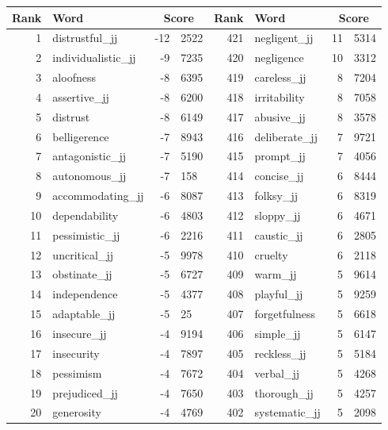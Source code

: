 \begin{table}[tbp]
    \begin{tabular}{| rlr@{.}l | rlr@{.}l |}
    \hline
    \textbf{Rank} & \textbf{Word} & \multicolumn{2}{c|}{\textbf{Score}} & \textbf{Rank} & \textbf{Word} & \multicolumn{2}{c|}{\textbf{Score}} \\
    \hline
    1 & distrustful\_jj & -12 & 2522    &    421 & negligent\_jj & 11 & 5314 \\
    2 & individualistic\_jj & -9 & 7235    &    420 & negligence & 10 & 3312 \\
    3 & aloofness & -8 & 6395    &    419 & careless\_jj & 8 & 7204 \\
    4 & assertive\_jj & -8 & 6200    &    418 & irritability & 8 & 7058 \\
    5 & distrust & -8 & 6149    &    417 & abusive\_jj & 8 & 3578 \\
    6 & belligerence & -7 & 8943    &    416 & deliberate\_jj & 7 & 9721 \\
    7 & antagonistic\_jj & -7 & 5190    &    415 & prompt\_jj & 7 & 4056 \\
    8 & autonomous\_jj & -7 & 158    &    414 & concise\_jj & 6 & 8444 \\
    9 & accommodating\_jj & -6 & 8087    &    413 & folksy\_jj & 6 & 8319 \\
    10 & dependability & -6 & 4803    &    412 & sloppy\_jj & 6 & 4671 \\
    11 & pessimistic\_jj & -6 & 2216    &    411 & caustic\_jj & 6 & 2805 \\
    12 & uncritical\_jj & -5 & 9978    &    410 & cruelty & 6 & 2118 \\
    13 & obstinate\_jj & -5 & 6727    &    409 & warm\_jj & 5 & 9614 \\
    14 & independence & -5 & 4377    &    408 & playful\_jj & 5 & 9259 \\
    15 & adaptable\_jj & -5 & 25    &    407 & forgetfulness & 5 & 6618 \\
    16 & insecure\_jj & -4 & 9194    &    406 & simple\_jj & 5 & 6147 \\
    17 & insecurity & -4 & 7897    &    405 & reckless\_jj & 5 & 5184 \\
    18 & pessimism & -4 & 7672    &    404 & verbal\_jj & 5 & 4268 \\
    19 & prejudiced\_jj & -4 & 7650    &    403 & thorough\_jj & 5 & 4257 \\
    20 & generosity & -4 & 4769    &    402 & systematic\_jj & 5 & 2098 \\

\end{tabular}
\end{table}
